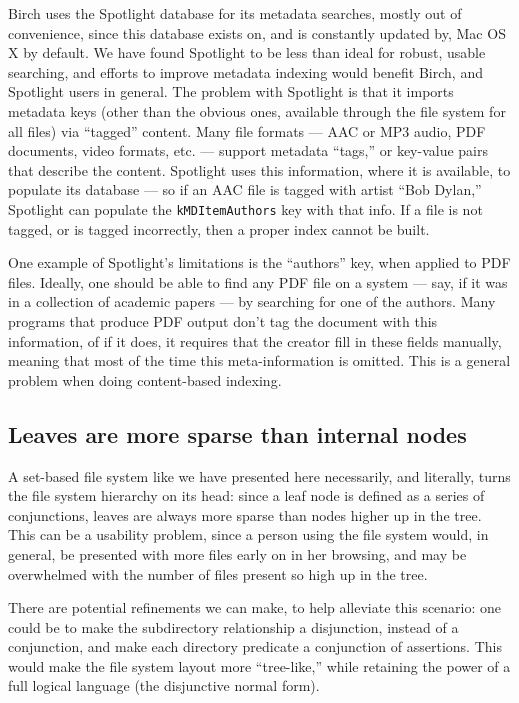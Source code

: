 \documentclass{article}
\begin{document}
Birch uses the Spotlight database for its metadata searches, mostly
out of convenience, since this database exists on, and is constantly
updated by, Mac OS X by default. We have found Spotlight to be less
than ideal for robust, usable searching, and efforts to improve
metadata indexing would benefit Birch, and Spotlight users in
general. The problem with Spotlight is that it imports metadata keys
(other than the obvious ones, available through the file system for
all files) via ``tagged'' content. Many file formats --- AAC or MP3
audio, PDF documents, video formats, etc. --- support metadata
``tags,'' or key-value pairs that describe the content. Spotlight uses
this information, where it is available, to populate its database ---
so if an AAC file is tagged with artist ``Bob Dylan,'' Spotlight can
populate the \texttt{kMDItemAuthors} key with that info. If a file is
not tagged, or is tagged incorrectly, then a proper index cannot be
built.

One example of Spotlight's limitations is the ``authors'' key, when
applied to PDF files. Ideally, one should be able to find any PDF file
on a system --- say, if it was in a collection of academic papers ---
by searching for one of the authors. Many programs that produce PDF
output don't tag the document with this information, of if it does, it
requires that the creator fill in these fields manually, meaning that
most of the time this meta-information is omitted. This is a general
problem when doing content-based indexing.

\subsection{Leaves are more sparse than internal nodes}

A set-based file system like we have presented here necessarily, and
literally, turns the file system hierarchy on its head: since a leaf
node is defined as a series of conjunctions, leaves are always more
sparse than nodes higher up in the tree. This can be a usability
problem, since a person using the file system would, in general, be
presented with more files early on in her browsing, and may be
overwhelmed with the number of files present so high up in the tree.

There are potential refinements we can make, to help alleviate this
scenario: one could be to make the subdirectory relationship a
disjunction, instead of a conjunction, and make each directory
predicate a conjunction of assertions. This would make the file system
layout more ``tree-like,'' while retaining the power of a full logical
language (the disjunctive normal form).
\end{document}
